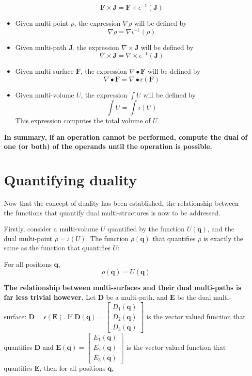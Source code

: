 \begin{itemize}
\[\mathbf{F} \times \mathbf{J} = \mathbf{F} \times \epsilon^{-1}(\mathbf{J})\]
\item Given multi-point \(\rho\), the expression \(\nabla \rho\) will be defined by 
\[\nabla \rho = \nabla \iota^{-1}(\rho)\]
\item Given multi-path \(\mathbf{J}\), the expression \(\nabla \times \mathbf{J}\) will be defined by 
\[\nabla \times \mathbf{J} = \nabla \times \epsilon^{-1}(\mathbf{J})\]
\item Given multi-surface \(\mathbf{F}\), the expression \(\nabla \bullet \mathbf{F}\) will be defined by 
\[\nabla \bullet \mathbf{F} = \nabla \bullet \epsilon(\mathbf{F})\]
\item Given multi-volume \(U\), the expression \(\int U\) will be defined by
\[\int U = \int \iota(U)\]
This expression computes the total volume of \(U\).
\end{itemize}

{\bf In summary, if an operation cannot be performed, compute the dual of one (or both) of the operands until the operation is possible.}



\section{Quantifying duality}

Now that the concept of duality has been established, the relationship between the functions that quantify dual multi-structures is now to be addressed. 

Firstly, consider a multi-volume \(U\) quantified by the function \(U(\mathbf{q})\), and the dual multi-point \(\rho = \iota(U)\). The function \(\rho(\mathbf{q})\) that quantifies \(\rho\) is exactly the same as the function that quantifies \(U\): 

For all positions \(\mathbf{q}\),
\[\rho(\mathbf{q}) = U(\mathbf{q})\]

{\bf The relationship between multi-surfaces and their dual multi-paths is far less trivial however.} Let \(\mathbf{D}\) be a multi-path, and \(\mathbf{E}\) be the dual multi-surface: \(\mathbf{D} = \epsilon(\mathbf{E})\). If \(\mathbf{D}(\mathbf{q}) = \begin{bmatrix} D_1(\mathbf{q}) \\ D_2(\mathbf{q}) \\ D_3(\mathbf{q}) \end{bmatrix}\) is the vector valued function that quantifies \(\mathbf{D}\) and \(\mathbf{E}(\mathbf{q}) = \begin{bmatrix} E_1(\mathbf{q}) \\ E_2(\mathbf{q}) \\ E_3(\mathbf{q}) \end{bmatrix}\) is the vector valued function that quantifies \(\mathbf{E}\), then for all positions \(\mathbf{q}\), 

